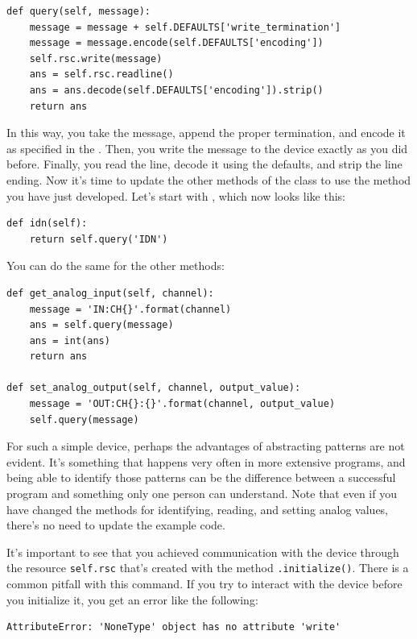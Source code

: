 \begin{verbatim}
def query(self, message):
    message = message + self.DEFAULTS['write_termination']
    message = message.encode(self.DEFAULTS['encoding'])
    self.rsc.write(message)
    ans = self.rsc.readline()
    ans = ans.decode(self.DEFAULTS['encoding']).strip()
    return ans
\end{verbatim}

In this way, you take the message, append the proper termination, and encode it as specified in the . Then, you write the message to the device exactly as you did before. Finally, you read the line, decode it using the defaults, and strip the line ending. Now it's time to update the other methods of the class to use the  method you have just developed. Let's start with , which now looks like this:

\begin{verbatim}
def idn(self):
    return self.query('IDN')
\end{verbatim}

You can do the same for the other methods:

\begin{verbatim}
def get_analog_input(self, channel):
    message = 'IN:CH{}'.format(channel)
    ans = self.query(message)
    ans = int(ans)
    return ans

def set_analog_output(self, channel, output_value):
    message = 'OUT:CH{}:{}'.format(channel, output_value)
    self.query(message)
\end{verbatim}

For such a simple device, perhaps the advantages of abstracting patterns are not evident. It's something that happens very often in more extensive programs, and being able to identify those patterns can be the difference between a successful program and something only one person can understand. Note that even if you have changed the methods for identifying, reading, and setting analog values, there's no need to update the example code.

It's important to see that you achieved communication with the device through the resource \texttt{self.rsc} that's created with the method \texttt{.initialize()}. There is a common pitfall with this command. If you try to interact with the device before you initialize it, you get an error like the following:

\begin{verbatim}
AttributeError: 'NoneType' object has no attribute 'write'
\end{verbatim}

